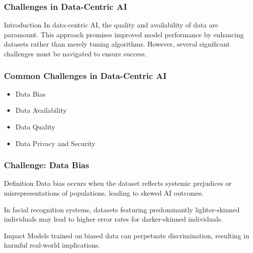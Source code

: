 \documentclass[aspectratio=169]{beamer}
\begin{document}
\begin{frame}[fragile]
    \frametitle{Challenges in Data-Centric AI}
    \begin{block}{Introduction}
        In data-centric AI, the quality and availability of data are paramount. This approach promises improved model performance by enhancing datasets rather than merely tuning algorithms. However, several significant challenges must be navigated to ensure success.
    \end{block}
\end{frame}

\begin{frame}[fragile]
    \frametitle{Common Challenges in Data-Centric AI}
    \begin{itemize}
        \item Data Bias
        \item Data Availability
        \item Data Quality
        \item Data Privacy and Security
    \end{itemize}
\end{frame}

\begin{frame}[fragile]
    \frametitle{Challenge: Data Bias}
    \begin{block}{Definition}
        Data bias occurs when the dataset reflects systemic prejudices or misrepresentations of populations, leading to skewed AI outcomes.
    \end{block}
    \begin{example}
        In facial recognition systems, datasets featuring predominantly lighter-skinned individuals may lead to higher error rates for darker-skinned individuals.
    \end{example}
    \begin{block}{Impact}
        Models trained on biased data can perpetuate discrimination, resulting in harmful real-world implications.
    \end{block}
\end{frame}
\end{document}
